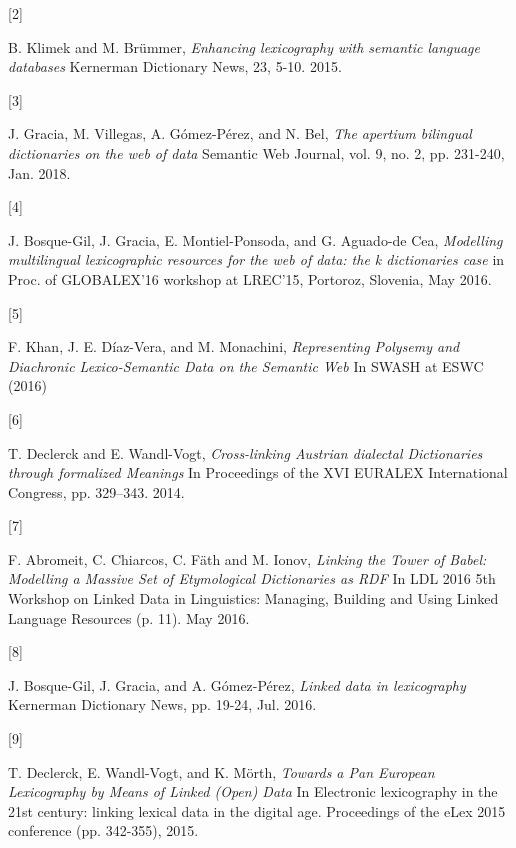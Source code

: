 \documentclass[a4paper]{article}
\newcommand\textstyleCitation[1]{\textit{#1}}
\begin{document}
\hypertarget{bibklimekkdict}{}[2] 

B. Klimek and M. Brümmer, \textstyleCitation{{\textquotedbl}Enhancing lexicography with semantic language databases{\textquotedbl}} Kernerman Dictionary News, 23, 5-10. 2015. 

\hypertarget{bibgraciaapertium}{}[3] 

J. Gracia, M. Villegas, A. Gómez-Pérez, and N. Bel, \textstyleCitation{{\textquotedbl}The apertium bilingual dictionaries on the web of data{\textquotedbl}} Semantic Web Journal, vol. 9, no. 2, pp. 231-240, Jan. 2018. 

\hypertarget{bibbosquekdict}{}[4] 

J. Bosque-Gil, J. Gracia, E. Montiel-Ponsoda, and G. Aguado-de Cea, \textstyleCitation{{\textquotedbl}Modelling multilingual lexicographic resources for the web of data: the k dictionaries case{\textquotedbl}} in Proc. of GLOBALEX'16 workshop at LREC'15, Portoroz, Slovenia, May 2016. 

\hypertarget{bibkahndiachronic}{}[5] 

F. Khan, J. E. Díaz-Vera, and M. Monachini, \textstyleCitation{{\textquotedbl}Representing Polysemy and Diachronic Lexico-Semantic Data on the Semantic Web{\textquotedbl}} In SWASH at ESWC (2016) 

\hypertarget{bibdeclerckdialectal}{}[6] 

T. Declerck and E. Wandl-Vogt, \textstyleCitation{{\textquotedbl}Cross-linking Austrian dialectal Dictionaries through formalized Meanings{\textquotedbl}} In Proceedings of the XVI EURALEX International Congress, pp. 329–343. 2014. 

\hypertarget{bibabromeitetymological}{}[7] 

F. Abromeit, C. Chiarcos, C. Fäth and M. Ionov, \textstyleCitation{{\textquotedbl}Linking the Tower of Babel: Modelling a Massive Set of Etymological Dictionaries as RDF{\textquotedbl}} In LDL 2016 5th Workshop on Linked Data in Linguistics: Managing, Building and Using Linked Language Resources (p. 11). May 2016. 

[8] 

J. Bosque-Gil, J. Gracia, and A. Gómez-Pérez, \textstyleCitation{{\textquotedbl}Linked data in lexicography{\textquotedbl}} Kernerman Dictionary News, pp. 19-24, Jul. 2016. 

[9] 

T. Declerck, E. Wandl-Vogt, and K. Mörth, \textstyleCitation{{\textquotedbl}Towards a Pan European Lexicography by Means of Linked (Open) Data{\textquotedbl}} In Electronic lexicography in the 21st century: linking lexical data in the digital age. Proceedings of the eLex 2015 conference (pp. 342-355), 2015. 
\end{document}
